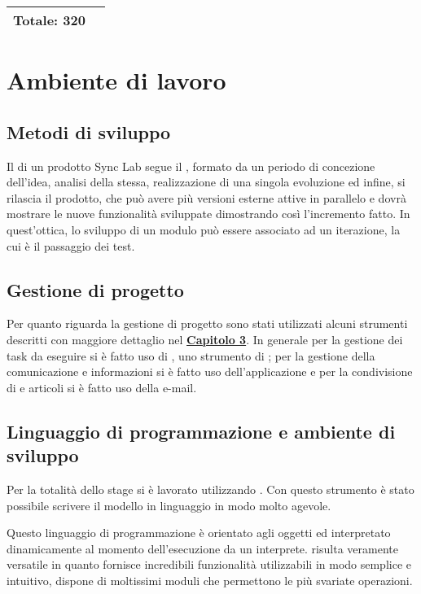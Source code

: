 \begin{center}
\begin{tabular}{|l|l|c l|}
		\hline
																	
		\multicolumn{2}{|l|}{\textbf{Totale: 320}} & \multicolumn{2}{l|}{}\\
		\hline
																												
	\end{tabular}
	\label{tableofwork}  
\end{center}
\newpage
\section{Ambiente di lavoro}
\subsection{Metodi di sviluppo}
Il  di un prodotto Sync Lab segue il , formato da un periodo di concezione dell'idea, analisi della stessa, realizzazione di una singola evoluzione ed infine, si rilascia il prodotto, che può avere più versioni esterne attive in parallelo e dovrà mostrare le nuove funzionalità sviluppate dimostrando così l'incremento fatto. In quest'ottica, lo sviluppo di un modulo può essere associato ad un iterazione, la cui  è il passaggio dei test.


\subsection{Gestione di progetto}
Per quanto riguarda la gestione di progetto sono stati utilizzati alcuni strumenti descritti con maggiore dettaglio nel \hyperlink{(chap:capitolo6)}{\textbf{Capitolo 3}}. In generale per la gestione dei task da eseguire si è fatto uso di , uno strumento di ; per la gestione della comunicazione e informazioni si è fatto uso dell'applicazione  e per la condivisione di  e articoli si è fatto uso della e-mail.
	
\subsection{Linguaggio di programmazione e ambiente di sviluppo}
Per la totalità dello stage si è lavorato utilizzando 
. Con questo strumento è stato possibile scrivere il modello in linguaggio  in modo molto agevole. 

Questo linguaggio di programmazione è orientato agli oggetti ed interpretato dinamicamente al momento dell'esecuzione da un interprete.  risulta veramente versatile in quanto fornisce incredibili funzionalità utilizzabili in modo semplice e intuitivo, dispone di moltissimi moduli che permettono le più svariate operazioni.
\newpage

